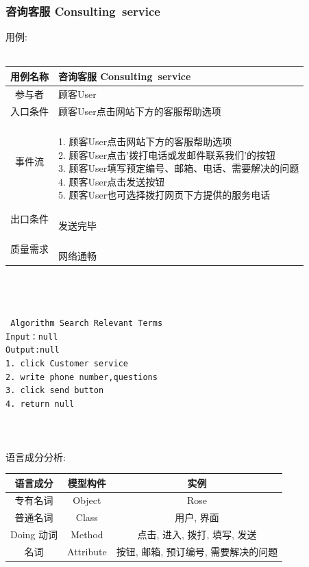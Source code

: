 \documentclass[11pt]{article}
\begin{document}
		\subsubsection{咨询客服 Consulting\ service}
			用例: \\ \\
			\begin{tabular}{c|l}
			\hline
			用例名称 & 咨询客服 Consulting\ service \\ \hline
			参与者 & 顾客User  \\ \hline
			入口条件 &  	顾客User点击网站下方的客服帮助选项 \\ \hline
			事件流 & 	\parbox{33em}{\ \\
						1. 顾客User点击网站下方的客服帮助选项 \\
						2. 顾客User点击'拨打电话或发邮件联系我们'的按钮 \\
						3. 顾客User填写预定编号、邮箱、电话、需要解决的问题  \\
						4. 顾客User点击发送按钮  \\
						5. 顾客User也可选择拨打网页下方提供的服务电话  \\
						} \\ \hline
			出口条件 & \parbox{33em}{\ \\
						发送完毕 \\
						} \\ \hline
			质量需求 & \parbox{33em}{\ \\
						网络通畅 \\
						} \\ \hline
			\end{tabular} \\ \\ \\
			\texttt{
			Algorithm Search Relevant Terms \\
			Input：null \\
			Output:null \\
			1.	click Customer service \\
			2.	write phone number,questions \\
			3.	click send button \\
			4.	return null \\
			} \\ \\ \\

			语言成分分析: \\
			\begin{center}
			\begin{tabular}{|c|c|c|}
			\hline
			语言成分 & 模型构件 & 实例\\ \hline
			专有名词 & Object & Rose  \\ \hline
			普通名词 & Class & 用户, 界面 \\ \hline
			Doing 动词 & Method & 点击, 进入, 拨打, 填写, 发送 \\ \hline
			名词 & Attribute & 按钮, 邮箱, 预订编号, 需要解决的问题 \\ \hline
			\end{tabular}
			\end{center}
\end{document}
